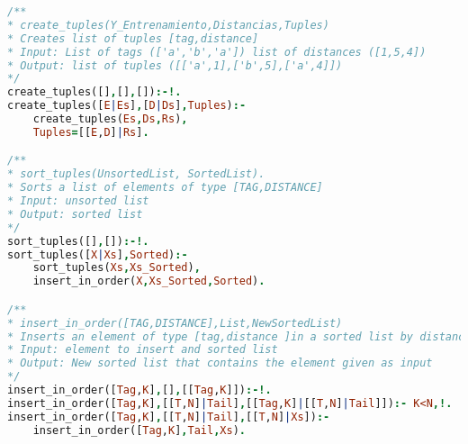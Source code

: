 \documentclass{article}
\begin{document}
\begin{appendices}
\begin{lstlisting}[language=prolog, captionpos=t, caption={Alternate implementation of \texttt{calcular\_K\_etiquetas\_mas\_relevantes/4}.}]
/**
* create_tuples(Y_Entrenamiento,Distancias,Tuples)
* Creates list of tuples [tag,distance]
* Input: List of tags (['a','b','a']) list of distances ([1,5,4])
* Output: list of tuples ([['a',1],['b',5],['a',4]])
*/
create_tuples([],[],[]):-!.
create_tuples([E|Es],[D|Ds],Tuples):-
    create_tuples(Es,Ds,Rs),
    Tuples=[[E,D]|Rs].

/**
* sort_tuples(UnsortedList, SortedList).
* Sorts a list of elements of type [TAG,DISTANCE]
* Input: unsorted list
* Output: sorted list
*/
sort_tuples([],[]):-!.
sort_tuples([X|Xs],Sorted):-
    sort_tuples(Xs,Xs_Sorted),
    insert_in_order(X,Xs_Sorted,Sorted).

/**
* insert_in_order([TAG,DISTANCE],List,NewSortedList)
* Inserts an element of type [tag,distance ]in a sorted list by distance
* Input: element to insert and sorted list
* Output: New sorted list that contains the element given as input
*/
insert_in_order([Tag,K],[],[[Tag,K]]):-!.
insert_in_order([Tag,K],[[T,N]|Tail],[[Tag,K]|[[T,N]|Tail]]):- K<N,!.
insert_in_order([Tag,K],[[T,N]|Tail],[[T,N]|Xs]):-
    insert_in_order([Tag,K],Tail,Xs).
\end{lstlisting} 


\end{appendices}
\end{document}
